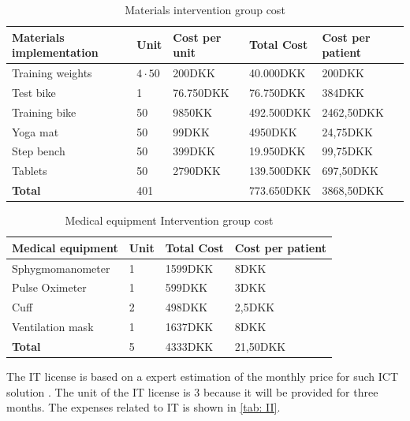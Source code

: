 \begin{table}[H]
\begin{longtabu} to 
    \textbf{Materials implementation} & \textbf{Unit} & \textbf{Cost per unit}&\textbf{Total Cost} & \textbf{Cost per patient} \\[-1ex]
    \midrule
    Training weights   &  $4\cdot50$ & 200DKK&  40.000DKK & 200DKK \\ \hline
    Test bike   & 1 & 76.750DKK & 76.750DKK & 384DKK  \\ \hline
    Training bike & 50 & 9850KK& 492.500DKK & 2462,50DKK \\ \hline
    Yoga mat   &  50 & 99DKK& 4950DKK &   24,75DKK \\ \hline 
    Step bench    &  50 & 399DKK & 19.950DKK  &   99,75DKK  \\ \hline 
    Tablets   &  50 & 2790DKK& 139.500DKK  &   697,50DKK\\ 
    \hline \hline \hline
    \textbf{Total} & 401 &  & 773.650DKK & 3868,50DKK
    \newline
   \end{longtabu}
\caption{Materials intervention group cost}
\label{tab: MI}
\end{table}

\begin{table}[H]
\begin{longtabu} to \linewidth{l l l l }
    \textbf{Medical equipment} & \textbf{Unit} &\textbf{Total Cost} & \textbf{Cost per patient} \\[-1ex]
    \midrule
    Sphygmomanometer  & 1  &1599DKK & 8DKK  \\ \hline
    Pulse Oximeter    &  1 & 599DKK &   3DKK \\ \hline 
    Cuff    &  2 & 498DKK  & 2,5DKK  \\ \hline 
    Ventilation mask   &  1 & 1637DKK  &   8DKK \\
    \hline \hline \hline
    \textbf{Total} & 5 & 4333DKK & 21,50DKK
    \newline
    \newline
   \end{longtabu}
\caption{Medical equipment Intervention group cost}
\label{tab: MeI}
\end{table}

The IT license is based on a expert estimation of the monthly price for such ICT solution \cite{sofoklis}. The unit of the IT license is 3 because it will be provided for three months. 
The expenses related to IT is shown in \cref{tab: II}.

